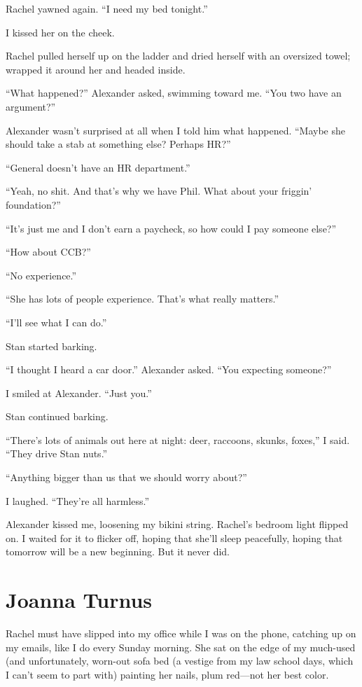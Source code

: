 Rachel yawned again. ``I need my bed tonight.''

I kissed her on the cheek.

Rachel pulled herself up on the ladder and dried herself with an
oversized towel; wrapped it around her and headed inside.

``What happened?'' Alexander asked, swimming toward me. ``You two have
an argument?''

Alexander wasn't surprised at all when I told him what happened. ``Maybe
she should take a stab at something else? Perhaps HR?''

``General doesn't have an HR department.''

``Yeah, no shit. And that's why we have Phil. What about your friggin'
foundation?''

``It's just me and I don't earn a paycheck, so how could I pay someone
else?''

``How about CCB?''

``No experience.''

``She has lots of people experience. That's what really matters.''

``I'll see what I can do.''

Stan started barking.

``I thought I heard a car door.'' Alexander asked. ``You expecting
someone?''

I smiled at Alexander. ``Just you.''

Stan continued barking.

``There's lots of animals out here at night: deer, raccoons, skunks,
foxes,'' I said. ``They drive Stan nuts.''

``Anything bigger than us that we should worry about?''

I laughed. ``They're all harmless.''

Alexander kissed me, loosening my bikini string. Rachel's bedroom light
flipped on. I waited for it to flicker off, hoping that she'll sleep
peacefully, hoping that tomorrow will be a new beginning. But it never
did.

\chapter{Joanna Turnus}

\titlemark

Rachel must have slipped into my office while I was on the phone,
catching up on my emails, like I do every Sunday morning. She sat on the
edge of my much-used (and unfortunately, worn-out sofa bed (a vestige
from my law school days, which I can't seem to part with) painting her
nails, plum red---not her best color.

